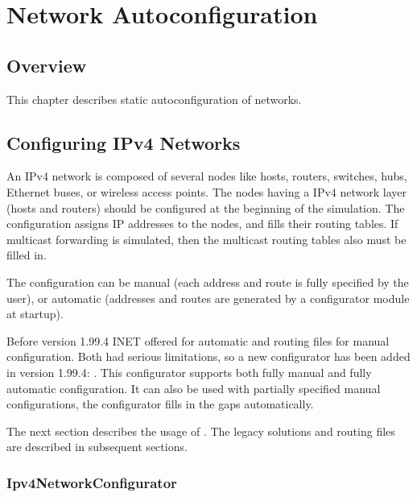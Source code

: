 \chapter{Network Autoconfiguration}
\label{cha:network-autoconfiguration}

\section{Overview}
\label{sec:autoconfig:overview}

This chapter describes static autoconfiguration of networks.

\section{Configuring IPv4 Networks}
\label{sec:autoconfig:configuring-ipv4-networks}

An IPv4 network is composed of several nodes like hosts, routers,
switches, hubs, Ethernet buses, or wireless access points.
The nodes having a IPv4 network layer (hosts and routers) should be
configured at the beginning of the simulation. The configuration
assigns IP addresses to the nodes, and fills their routing tables.
If multicast forwarding is simulated, then the multicast routing
tables also must be filled in.


The configuration can be manual (each address and route is fully specified
by the user), or automatic (addresses and routes are generated by
a configurator module at startup).

Before version 1.99.4 INET offered 
for automatic and routing files for manual configuration.
Both had serious limitations, so a new configurator has been added
in version 1.99.4: . This configurator
supports both fully manual and fully automatic configuration. It
can also be used with partially specified manual configurations,
the configurator fills in the gaps automatically.

The next section describes the usage of .
The legacy solutions  and
routing files are described in subsequent sections.

\subsection{Ipv4NetworkConfigurator}
\label{sec:autoconfig:ipv4networkconfigurator}

